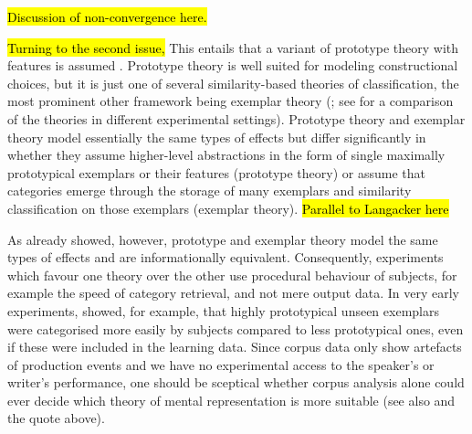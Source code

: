 \hl{Discussion of non-convergence here.}


\hl{Turning to the second issue, }
This entails that a variant of prototype theory with features is assumed \citep{Rosch1978}.
Prototype theory is well suited for modeling constructional choices, but it is just one of several similarity-based theories of classification, the most prominent other framework being exemplar theory (\citealp{MedinSchaffer1978,Hintzman1986}; see \citealp{StormsEa2000} for a comparison of the theories in different experimental settings).
Prototype theory and exemplar theory model essentially the same types of effects but differ significantly in whether they assume higher-level abstractions in the form of single maximally prototypical exemplars or their features (prototype theory) or assume that categories emerge through the storage of many exemplars and similarity classification on those exemplars (exemplar theory).
\hl{Parallel to Langacker here}

As \cite{Barsalou1990} already showed, however, prototype and exemplar theory model the same types of effects and are informationally equivalent.
Consequently, experiments which favour one theory over the other use procedural behaviour of subjects, for example the speed of category retrieval, and not mere output data.
In very early experiments, \cite{PosnerKeele1968} showed, for example, that highly prototypical unseen exemplars were categorised more easily by subjects compared to less prototypical ones, even if these were included in the learning data.
Since corpus data only show artefacts of production events and we have no experimental access to the speaker's or writer's performance, one should be sceptical whether corpus analysis alone could ever decide which theory of mental representation is more suitable (see also \citealp[22]{Gries2003} and the \citealp[486--487]{Dabrowska2016} quote above).


